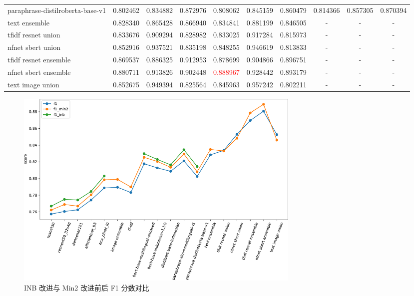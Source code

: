 \documentclass[12pt]{article}
\begin{document}
\begin{table}
\begin{tabular}{lccccccccc}
    paraphrase-distilroberta-base-v1 & 0.802462 & 0.834882 & 0.872976  & 0.808062 & 0.845159     & 0.860479        & 0.814366 & 0.857305    & 0.870394       \\
    text ensemble                    & 0.828340 & 0.865428 & 0.866940  & 0.834841 & 0.881199     & 0.846505        & -        & -           & -              \\
    tfidf resnet union               & 0.833676 & 0.909294 & 0.828982  & 0.833025 & 0.917284     & 0.815973        & -        & -           & -              \\
    nfnet sbert union                & 0.852916 & 0.937521 & 0.835198  & 0.848255 & 0.946619     & 0.813833        & -        & -           & -              \\
    tfidf resnet ensemble            & 0.869537 & 0.886325 & 0.912953  & 0.878699 & 0.904866     & 0.896751        & -        & -           & -              \\
    nfnet sbert ensemble             & 0.880711 & 0.913826 & 0.902448  & \textcolor{red}{0.888967} & 0.928442     & 0.893179        & -        & -           & -              \\
    text image union                 & 0.852675 & 0.949394 & 0.825564  & 0.845963 & 0.957242     & 0.802211        & -        & -           & -             \\
    \bottomrule
  \end{tabular}
\end{table}

\begin{figure}[htbp]
  \centering
  \includegraphics[width=14cm]{results_plot_f1_df.pdf}
  \caption{INB 改进与 Min2 改进前后 F1 分数对比}
  \label{fig:results_summary_f1}
\end{figure}
\end{document}

